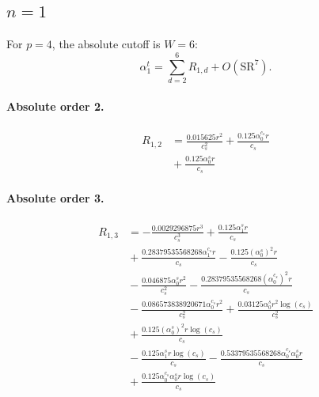 \documentclass[10pt]{article}
\begin{document}
\subsection{$n=1$}
For $p=4$, the absolute cutoff is $W=6$:
\[\alpha_{1}^t=\sum_{d=2}^{6}R_{1,d}+O(\mathrm{SR}^{7}).\]
\paragraph{Absolute order 2.}
\begin{align*}
R_{1,2} &= \frac{0.015625 r^{2}}{c_{s}^{2}} + \frac{0.125 \alpha_{0}^{c_s} r}{c_{s}} \\
&{}  + \frac{0.125 \alpha_{0}^s r}{c_{s}}
\end{align*}

\paragraph{Absolute order 3.}
\begin{align*}
R_{1,3} &=  - \frac{0.0029296875 r^{3}}{c_{s}^{3}} + \frac{0.125 \alpha_{1}^s r}{c_{s}} \\
&{}  + \frac{0.28379535568268 \alpha_{1}^{c_s} r}{c_{s}} - \frac{0.125 \left(\alpha_{0}^s\right)^{2} r}{c_{s}} \\
&{}  - \frac{0.046875 \alpha_{0}^s r^{2}}{c_{s}^{2}} - \frac{0.28379535568268 \left(\alpha_{0}^{c_s}\right)^{2} r}{c_{s}} \\
&{}  - \frac{0.086573838920671 \alpha_{0}^{c_s} r^{2}}{c_{s}^{2}} + \frac{0.03125 \alpha_{0}^s r^{2} \log{\left(c_{s} \right)}}{c_{s}^{2}} \\
&{}  + \frac{0.125 \left(\alpha_{0}^s\right)^{2} r \log{\left(c_{s} \right)}}{c_{s}} \\
&{}  - \frac{0.125 \alpha_{1}^s r \log{\left(c_{s} \right)}}{c_{s}} - \frac{0.53379535568268 \alpha_{0}^{c_s} \alpha_{0}^s r}{c_{s}} \\
&{}  + \frac{0.125 \alpha_{0}^{c_s} \alpha_{0}^s r \log{\left(c_{s} \right)}}{c_{s}}
\end{align*}
\end{document}
